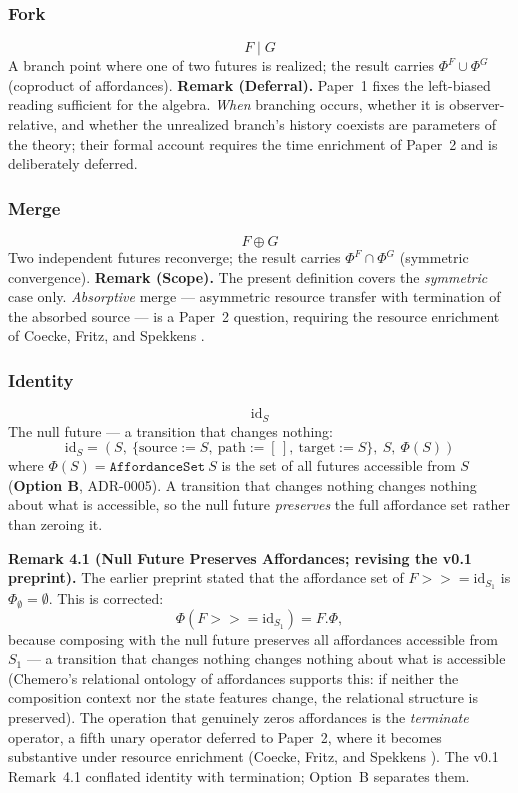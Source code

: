 \documentclass[11pt,a4paper]{article}
\newcommand{\seqBind}{\mathbin{>>=}}
\newcommand{\fork}{\mathbin{|}}
\newcommand{\merge}{\oplus}
\newcommand{\id}{\text{id}}
\begin{document}
\subsubsection{Fork}
\[
F \fork G
\]
A branch point where one of two futures is realized; the result carries
$\Phi^{F} \cup \Phi^{G}$ (coproduct of affordances). \textbf{Remark
(Deferral).} Paper~1 fixes the left-biased reading sufficient for the
algebra. \emph{When} branching occurs, whether it is observer-relative, and
whether the unrealized branch's history coexists are parameters of the
theory; their formal account requires the time enrichment of Paper~2 and is
deliberately deferred.

\subsubsection{Merge}
\[
F \merge G
\]
Two independent futures reconverge; the result carries $\Phi^{F} \cap \Phi^{G}$
(symmetric convergence). \textbf{Remark (Scope).} The present definition covers
the \emph{symmetric} case only. \emph{Absorptive} merge --- asymmetric
resource transfer with termination of the absorbed source --- is a Paper~2
question, requiring the resource enrichment of Coecke, Fritz, and Spekkens
\cite{coecke2016}.

\subsubsection{Identity}
\[
\id_S
\]
The null future — a transition that changes nothing:
\[
\id_S = (S,\ \{\text{source} := S,\ \text{path} := [\,],\ \text{target} := S\},\ S,\ \Phi(S))
\]
where $\Phi(S) = \texttt{AffordanceSet}~S$ is the set of all futures accessible
from $S$ (\textbf{Option B}, ADR-0005). A transition that changes nothing
changes nothing about what is accessible, so the null future \emph{preserves}
the full affordance set rather than zeroing it.

\textbf{Remark 4.1 (Null Future Preserves Affordances; revising the v0.1
preprint).} The earlier preprint stated that the affordance set of
$F \seqBind \id_{S_1}$ is $\Phi_\emptyset = \emptyset$. This is corrected:
\[
\Phi(F \seqBind \id_{S_1}) = F.\Phi,
\]
because composing with the null future preserves all affordances accessible
from $S_1$ --- a transition that changes nothing changes nothing about what is
accessible (Chemero's relational ontology of affordances \cite{chemero2003}
supports this: if neither the composition context nor the state features
change, the relational structure is preserved). The operation that genuinely
zeros affordances is the \emph{terminate} operator, a fifth unary operator
deferred to Paper~2, where it becomes substantive under resource enrichment
(Coecke, Fritz, and Spekkens \cite{coecke2016}). The v0.1 Remark~4.1 conflated
identity with termination; Option~B separates them.
\end{document}
